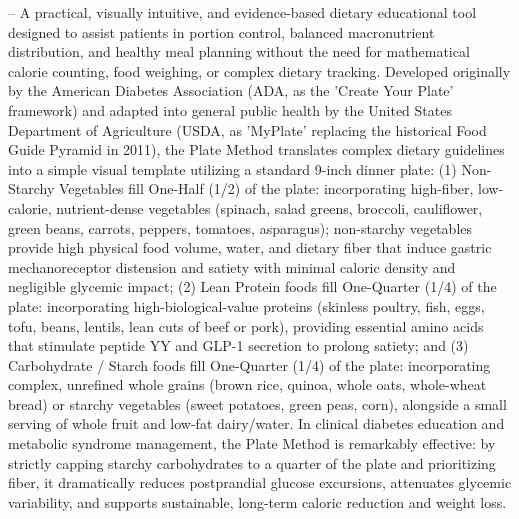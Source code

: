 -- A practical, visually intuitive, and evidence-based dietary educational tool designed to assist patients in portion control, balanced macronutrient distribution, and healthy meal planning without the need for mathematical calorie counting, food weighing, or complex dietary tracking. Developed originally by the American Diabetes Association (ADA, as the 'Create Your Plate' framework) and adapted into general public health by the United States Department of Agriculture (USDA, as 'MyPlate' replacing the historical Food Guide Pyramid in 2011), the Plate Method translates complex dietary guidelines into a simple visual template utilizing a standard 9-inch dinner plate: (1) Non-Starchy Vegetables fill One-Half (1/2) of the plate: incorporating high-fiber, low-calorie, nutrient-dense vegetables (spinach, salad greens, broccoli, cauliflower, green beans, carrots, peppers, tomatoes, asparagus); non-starchy vegetables provide high physical food volume, water, and dietary fiber that induce gastric mechanoreceptor distension and satiety with minimal caloric density and negligible glycemic impact; (2) Lean Protein foods fill One-Quarter (1/4) of the plate: incorporating high-biological-value proteins (skinless poultry, fish, eggs, tofu, beans, lentils, lean cuts of beef or pork), providing essential amino acids that stimulate peptide YY and GLP-1 secretion to prolong satiety; and (3) Carbohydrate / Starch foods fill One-Quarter (1/4) of the plate: incorporating complex, unrefined whole grains (brown rice, quinoa, whole oats, whole-wheat bread) or starchy vegetables (sweet potatoes, green peas, corn), alongside a small serving of whole fruit and low-fat dairy/water. In clinical diabetes education and metabolic syndrome management, the Plate Method is remarkably effective: by strictly capping starchy carbohydrates to a quarter of the plate and prioritizing fiber, it dramatically reduces postprandial glucose excursions, attenuates glycemic variability, and supports sustainable, long-term caloric reduction and weight loss.

